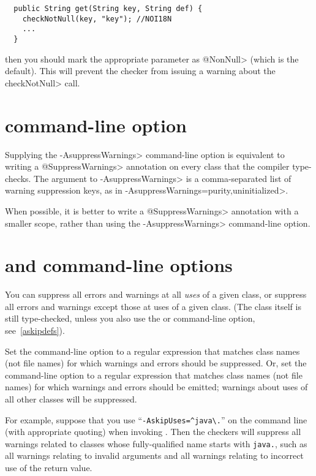 \begin{Verbatim}
  public String get(String key, String def) {
    checkNotNull(key, "key"); //NOI18N
    ...
  }
\end{Verbatim}

\noindent
then you should mark the appropriate parameter as \<@NonNull> (which is the
default).  This will prevent the checker from issuing a warning about the
\<checkNotNull> call.



\section{ command-line option\label{suppresswarnings-command-line}}

Supplying the \<-AsuppressWarnings> command-line option is equivalent to
writing a \<@SuppressWarnings> annotation on every class that the compiler
type-checks.  The argument to \<-AsuppressWarnings> is a comma-separated
list of warning suppression keys, as in
\<-AsuppressWarnings=purity,uninitialized>.

When possible, it is better to write a \<@SuppressWarnings> annotation with a
smaller scope, rather than using the \<-AsuppressWarnings> command-line option.


\section{ and  command-line options\label{askipuses}}

You can suppress all errors and warnings at all \emph{uses} of a given
class, or suppress all errors and warnings except those at uses of a given
class.  (The class itself is still type-checked, unless you also use
the  or  command-line option, see~\ref{askipdefs}).

Set the  command-line option to a
regular expression that matches class names (not file names) for which warnings and errors
should be suppressed.
Or, set the  command-line option to a
regular expression that matches class names (not file names) for which warnings and errors
should be emitted; warnings about uses of all other classes will be suppressed.

For example, suppose that you use
``{\codesize\verb|-AskipUses=^java\.|}'' on the command line
(with appropriate quoting) when invoking
.  Then the checkers will suppress all warnings related to
classes whose fully-qualified name starts with \codesize\verb|java.|, such
as all warnings relating to invalid arguments and all warnings relating to
incorrect use of the return value.

